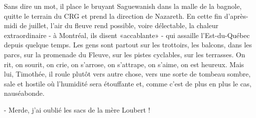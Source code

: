 Sans dire un mot, il place le bruyant Saguewanish dans la malle de la bagnole, quitte le terrain du CRG et prend la direction de Nazareth. En cette fin d’après-midi de juillet, l’air du fleuve rend possible, voire délectable, la chaleur extraordinaire - à Montréal, ils disent «accablante» - qui assaille l’Est-du-Québec depuis quelque temps. Les gens sont partout sur les trottoirs, les balcons, dans les parcs, sur la promenade du Fleuve, sur les pistes cyclables, sur les terrasses. On rit, on sourit, on crie, on s’arrose, on s’attrape, on s’aime, on est heureux. Mais lui, Timothée, il roule plutôt vers autre chose, vers une sorte de tombeau sombre, sale et hostile où l’humidité sera étouffante et, comme c’est de plus en plus le cas, nauséabonde.

- Merde, j’ai oublié les sacs de la mère Loubert !
